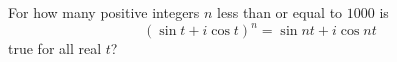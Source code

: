 For how many positive integers $n$ less than or equal to $1000$ is \[(\sin t + i \cos t)^n=\sin nt + i \cos nt\]true for all real $t$?